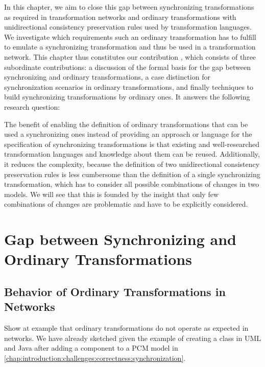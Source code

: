 In this chapter, we aim to close this gap between synchronizing transformations as required in transformation networks and ordinary transformations with unidirectional consistency preservation rules used by transformation languages.
We investigate which requirements such an ordinary transformation has to fulfill to emulate a synchronizing transformation and thus be used in a transformation network.
This chapter thus constitutes our contribution , which consists of three subordinate contributions: a discussion of the formal basis for the gap between synchronizing and ordinary transformations, a case distinction for synchronization scenarios in ordinary transformations, and finally techniques to build synchronizing transformations by ordinary ones.
It answers the following research question:


The benefit of enabling the definition of ordinary transformations that can be used a synchronizing ones instead of providing an approach or language for the specification of synchronizing transformations is that existing and well-researched transformation languages and knowledge about them can be reused.
Additionally, it reduces the complexity, because the definition of two unidirectional consistency preservation rules is less cumbersome than the definition of a single synchronizing transformation, which has to consider all possible combinations of changes in two models.
We will see that this is founded by the insight that only few combinations of changes are problematic and have to be explicitly considered.



\section{Gap between Synchronizing and Ordinary Transformations}


\subsection{Behavior of Ordinary Transformations in Networks}
Show at example that ordinary transformations do not operate as expected in networks.
We have already sketched given the example of creating a class in UML and Java after adding a component to a \gls{PCM} model in \autoref{chap:introduction:challenges:correctness:synchronization}.

